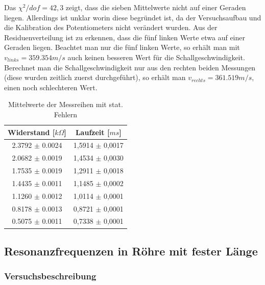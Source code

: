 \documentclass[12pt,a4paper]{article}
\begin{document}
	Das $\chi^2/dof=42,3$ zeigt, dass die sieben Mittelwerte nicht auf einer Geraden liegen. Allerdings ist unklar worin diese begründet ist, da der Versuchsaufbau und die Kalibration des Potentiometers nicht verändert wurden. Aus der Residuenverteilung ist zu erkennen, dass die fünf linken Werte etwa auf einer Geraden liegen. Beachtet man nur die fünf linken Werte, so erhält man mit $v_{links} = 359.354 m/s$ auch keinen besseren Wert für die Schallgeschwindigkeit.  Berechnet man die Schallgeschwindigkeit nur aus den rechten beiden Messungen (diese wurden zeitlich zuerst durchgeführt), so erhält man $v_{rechts} = 361.519 m/s$, einen noch schlechteren Wert.
	\begin{table}
		\begin{center}
			\begin{tabular}{|c|c|}
				\hline
				\textbf{Widerstand [$k\Omega$]} & \textbf{Laufzeit [$ms$]} \\
				\hline
				2.3792 $\pm$ 0.0024 & 1,5914 $\pm$ 0,0017\\
				\hline
				2.0682 $\pm$ 0.0019 & 1,4534 $\pm$ 0,0030\\
				\hline
				1.7535 $\pm$ 0.0019 & 1,2911 $\pm$ 0,0018\\
				\hline
				1.4435 $\pm$ 0.0011& 1,1485 $\pm$ 0,0002\\
				\hline
				1.1260 $\pm$ 0.0012& 1,0114 $\pm$ 0,0001\\
				\hline
				0.8178 $\pm$ 0.0013& 0,8721 $\pm$ 0,0001 \\
				\hline
				0.5075 $\pm$ 0.0011&  0,7338 $\pm$ 0,0001 \\
				\hline
			\end{tabular}
		\end{center}
		\caption{Mittelwerte der Messreihen mit stat. Fehlern}
	\end{table}











\subsection{Resonanzfrequenzen in Röhre mit fester Länge}

\subsubsection{Versuchsbeschreibung}
\end{document}
